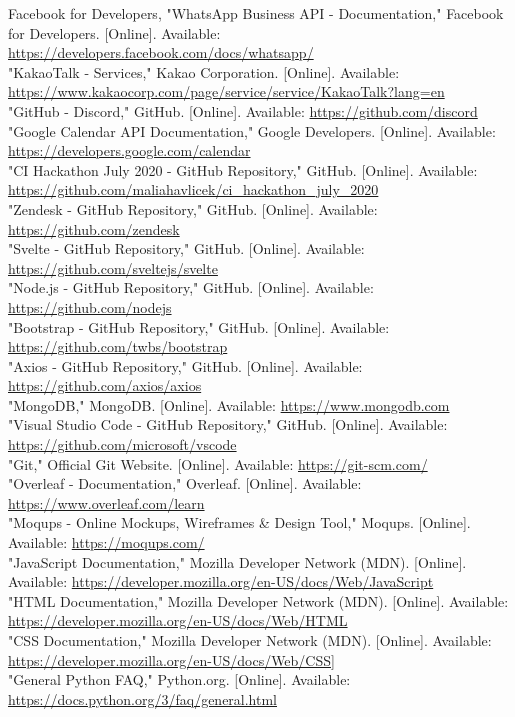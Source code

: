 \documentclass[conference]{IEEEtran}
\begin{document}
\begin{thebibliography}{00}
 Facebook for Developers, "WhatsApp Business API - Documentation," Facebook for Developers. [Online]. Available: \url{https://developers.facebook.com/docs/whatsapp/}\\
 "KakaoTalk - Services," Kakao Corporation. [Online]. Available: \url{https://www.kakaocorp.com/page/service/service/KakaoTalk?lang=en}\\
 "GitHub - Discord," GitHub. [Online]. Available: \url{https://github.com/discord}\\
 "Google Calendar API Documentation," Google Developers. [Online]. Available: \url{https://developers.google.com/calendar}\\
 "CI Hackathon July 2020 - GitHub Repository," GitHub. [Online]. Available: \url{https://github.com/maliahavlicek/ci\_hackathon\_july\_2020}\\
 "Zendesk - GitHub Repository," GitHub. [Online]. Available: \url{https://github.com/zendesk}\\
 "Svelte - GitHub Repository," GitHub. [Online]. Available: \url{https://github.com/sveltejs/svelte}\\
 "Node.js - GitHub Repository," GitHub. [Online]. Available: \url{https://github.com/nodejs}\\
 "Bootstrap - GitHub Repository," GitHub. [Online]. Available: \url{https://github.com/twbs/bootstrap}\\
 "Axios - GitHub Repository," GitHub. [Online]. Available: \url{https://github.com/axios/axios}\\
 "MongoDB," MongoDB. [Online]. Available: \url{https://www.mongodb.com}\\
 "Visual Studio Code - GitHub Repository," GitHub. [Online]. Available: \url{https://github.com/microsoft/vscode}\\
 "Git," Official Git Website. [Online]. Available: \url{https://git-scm.com/}\\
 "Overleaf - Documentation," Overleaf. [Online]. Available: \url{https://www.overleaf.com/learn}\\
 "Moqups - Online Mockups, Wireframes \& Design Tool," Moqups. [Online]. Available: \url{https://moqups.com/}\\
 "JavaScript Documentation," Mozilla Developer Network (MDN). [Online]. Available: \url{https://developer.mozilla.org/en-US/docs/Web/JavaScript}\\
 "HTML Documentation," Mozilla Developer Network (MDN). [Online]. Available: \url{https://developer.mozilla.org/en-US/docs/Web/HTML}\\
 "CSS Documentation," Mozilla Developer Network (MDN). [Online]. Available: \url{https://developer.mozilla.org/en-US/docs/Web/CSS]}\\
 "General Python FAQ," Python.org. [Online]. Available: \url{https://docs.python.org/3/faq/general.html}\\
\end{thebibliography}
\end{document}
